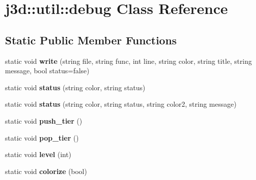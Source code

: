 \hypertarget{classj3d_1_1util_1_1debug}{}\section{j3d\+:\+:util\+:\+:debug Class Reference}
\label{classj3d_1_1util_1_1debug}
\subsection*{Static Public Member Functions}
\begin{DoxyCompactItemize}
\item 
\hypertarget{classj3d_1_1util_1_1debug_a46c2655b361d999a38ea6a5fda13a44c}{}static void {\bfseries write} (string file, string func, int line, string color, string title, string message, bool status=false)\label{classj3d_1_1util_1_1debug_a46c2655b361d999a38ea6a5fda13a44c}

\item 
\hypertarget{classj3d_1_1util_1_1debug_a5600d9143916c312ac09bc0d67c61d02}{}static void {\bfseries status} (string color, string status)\label{classj3d_1_1util_1_1debug_a5600d9143916c312ac09bc0d67c61d02}

\item 
\hypertarget{classj3d_1_1util_1_1debug_afa07b0598be16dc230a2e593964b8b85}{}static void {\bfseries status} (string color, string status, string color2, string message)\label{classj3d_1_1util_1_1debug_afa07b0598be16dc230a2e593964b8b85}

\item 
\hypertarget{classj3d_1_1util_1_1debug_a8566fe1326765aacc893c20420f5f267}{}static void {\bfseries push\+\_\+tier} ()\label{classj3d_1_1util_1_1debug_a8566fe1326765aacc893c20420f5f267}

\item 
\hypertarget{classj3d_1_1util_1_1debug_ae0b373c08e861840e7f072ffa71ef8fa}{}static void {\bfseries pop\+\_\+tier} ()\label{classj3d_1_1util_1_1debug_ae0b373c08e861840e7f072ffa71ef8fa}

\item 
\hypertarget{classj3d_1_1util_1_1debug_a77da257ea99b156f3d7561dd6255a3e4}{}static void {\bfseries level} (int)\label{classj3d_1_1util_1_1debug_a77da257ea99b156f3d7561dd6255a3e4}

\item 
\hypertarget{classj3d_1_1util_1_1debug_a66323699c0723165c71b31c332d05c15}{}static void {\bfseries colorize} (bool)\label{classj3d_1_1util_1_1debug_a66323699c0723165c71b31c332d05c15}


\end{DoxyCompactItemize}
